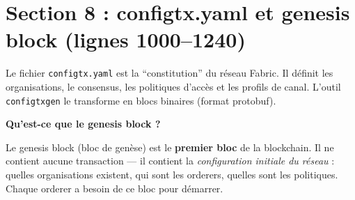 \documentclass[12pt,a4paper,twoside]{report}
\begin{document}
\section{Section 8 : configtx.yaml et genesis block (lignes 1000--1240)}

Le fichier \texttt{configtx.yaml} est la ``constitution'' du réseau Fabric. Il définit les organisations, le consensus, les politiques d'accès et les profils de canal. L'outil \texttt{configtxgen} le transforme en blocs binaires (format protobuf).

\begin{infobox}
\textbf{Qu'est-ce que le genesis block ?}

Le genesis block (bloc de genèse) est le \textbf{premier bloc} de la blockchain. Il ne contient aucune transaction --- il contient la \textit{configuration initiale du réseau} : quelles organisations existent, qui sont les orderers, quelles sont les politiques. Chaque orderer a besoin de ce bloc pour démarrer.
\end{infobox}
\end{document}
